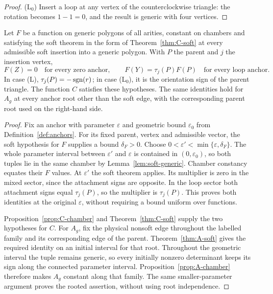 \begin{proof}
(L$_0$) Insert a loop at any vertex of the counterclockwise triangle: the
rotation becomes $1-1=0$, and the result is generic with four vertices.
\end{proof}

\begin{proposition}\label{prop:anchor-values}
Let $F$ be a function on generic polygons of all arities, constant
on chambers and satisfying the soft theorem in the form of
Theorem~\ref{thm:C-soft} at every admissible soft insertion into
a generic polygon. With $P$ the parent and $j$ the insertion vertex,
\[
F(Z)=0\quad\text{for every zero anchor},\qquad
F(Y)=\tau_j(P)F(P)\quad\text{for every loop anchor}.
\]
In case (L), $\tau_j(P)=-\operatorname{sgn}(r)$; in case (L$_0$), it is the
orientation sign of the parent triangle. The function $C$ satisfies
these hypotheses. The same identities hold for $A_g$ at every
anchor root other than the soft edge, with the corresponding
parent root used on the right-hand side.
\end{proposition}
\begin{proof}
Fix an anchor with parameter $\varepsilon$ and geometric bound
$\varepsilon_0$ from Definition~\ref{def:anchors}. For its fixed
parent, vertex and admissible vector, the soft hypothesis for $F$
supplies a bound $\delta_F>0$. Choose
$0<\varepsilon'<\min\{\varepsilon,\delta_F\}$.
The whole parameter interval between $\varepsilon'$ and
$\varepsilon$ is contained in $(0,\varepsilon_0)$, so both tuples
lie in the same chamber by Lemma~\ref{lem:soft-generic}.
Chamber constancy equates their $F$ values. At $\varepsilon'$ the
soft theorem applies. Its multiplier is zero in the mixed sector,
since the attachment signs are opposite. In the loop sector both
attachment signs equal $\tau_j(P)$, so the multiplier is
$\tau_j(P)$. This proves both identities at the original
$\varepsilon$, without requiring a bound uniform over functions.

Proposition~\ref{prop:C-chamber} and Theorem~\ref{thm:C-soft}
supply the two hypotheses for $C$. For $A_g$, fix the physical
nonsoft edge throughout the labelled family and its corresponding
edge of the parent. Theorem~\ref{thm:A-soft} gives the required
identity on an initial interval for that root. Throughout the
geometric interval the tuple remains generic, so every initially
nonzero determinant keeps its sign along the connected parameter
interval. Proposition~\ref{prop:A-chamber} therefore makes $A_g$
constant along that family. The same smaller-parameter argument
proves the rooted assertion, without using root independence.
\end{proof}
